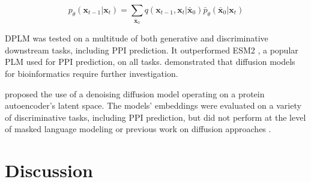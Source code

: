\documentclass{article}
\begin{document}
\[ p_{\theta}(\mathbf{x}_{t-1}|\mathbf{x}_t) = \sum_{\bar{\mathbf{x}}_0} q(\mathbf{x}_{t-1}, \mathbf{x}_t| \bar{\mathbf{x}}_0) \bar{p}_{\theta}(\bar{\mathbf{x}}_0|\mathbf{x}_t) \]

DPLM was tested on a multitude of both generative and discriminative downstream tasks, including PPI prediction. It outperformed ESM2 \citep{lin_evolutionary-scale_2023}, a popular PLM used for PPI prediction, on all tasks. \citet{wang_diffusion_2024} demonstrated that diffusion models for bioinformatics require further investigation.

\citet{quinn2025discriminativeproteinsequencemodelling} proposed the use of a denoising diffusion model operating on a protein autoencoder's latent space. The models' embeddings were evaluated on a variety of discriminative tasks, including PPI prediction, but did not perform at the level of masked language modeling or previous work on diffusion approaches \citep{wang_diffusion_2024}.

\section{Discussion}
\end{document}
